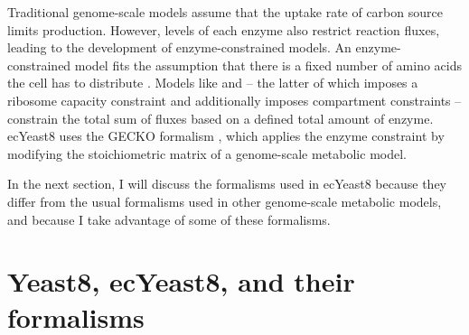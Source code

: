 Traditional genome-scale models assume that the uptake rate of carbon source limits production.
However, levels of each enzyme also restrict reaction fluxes, leading to the development of enzyme-constrained models.
An enzyme-constrained model fits the assumption that there is a fixed number of amino acids the cell has to distribute \parencite{weisseMechanisticLinksCellular2015}.
Models like \textcite{sanchezImprovingPhenotypePredictions2017} and \textcite{elsemmanWholecellModelingYeast2022} -- the latter of which imposes a ribosome capacity constraint and additionally imposes compartment constraints -- constrain the total sum of fluxes based on a defined total amount of enzyme.
ecYeast8 uses the GECKO formalism \parencite{sanchezImprovingPhenotypePredictions2017}, which applies the enzyme constraint by modifying the stoichiometric matrix of a genome-scale metabolic model.

In the next section, I will discuss the formalisms used in ecYeast8 because they differ from the usual formalisms used in other genome-scale metabolic models, and because I take advantage of some of these formalisms.

\section{Yeast8, ecYeast8, and their formalisms}
\label{sec:model-yeast8}

